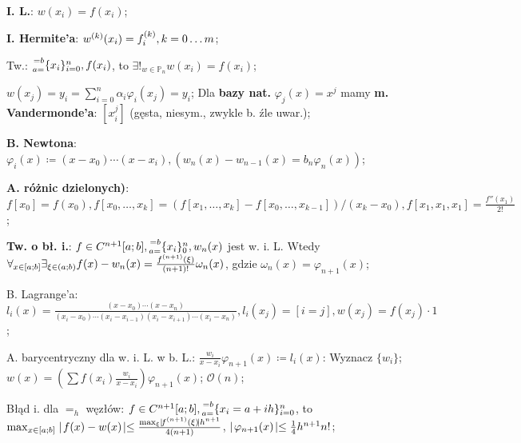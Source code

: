 
\entry
\textbf{I. L.}:
$w(x_i) = f(x_i)$;

\entry
\textbf{I. Hermite'a}:
$w^{(k)}(x_i) = f^{(k)}_i, k = 0 \ldots m$;

\entry
Tw.:
$\ipoints[i=0][n][a=][=b]{x_i}, f(x_i)$,
to
$\exists!_{w \in \mathbb{P}_n} w(x_i)=f(x_i)$;

\entry
$w(x_j) = y_i = \sum_{i=0}^n\alpha_i\varphi_i(x_j) = y_i$;
\entry
Dla \textbf{bazy nat.}
$\varphi_j(x)=x^j$
mamy \textbf{m. Vandermonde'a}:
$[x^j_i]$
(gęsta, niesym., zwykle b. źle uwar.);

\entry
\textbf{B. Newtona}:
$\varphi_i(x) \coloneqq (x-x_0)\cdots(x-x_i),
(w_n(x)-w_{n-1}(x) = b_n\varphi_n(x))$;

\entry
\textbf{A. różnic dzielonych)}:
$
f[x_0] = f(x_0),
f[x_0,\ldots,x_k] = (f[x_1,\ldots,x_k] - f[x_0,\ldots,x_{k-1}])/(x_k - x_0),
f[x_1, x_1, x_1] = \frac{f''(x_1)}{2!}
$;


\textbf{Tw. o bł. i.}:
$f\in C^{n+1}[a;b], \ipoints[0][n][a=][=b]{x_i}, w_n(x)$ jest w. i. L.
Wtedy
$\forall_{x \in [a;b]} \exists_{\xi \in (a;b)} f(x) - w_n(x) = \frac{f^{(n+1)}(\xi)}{(n+1)!}\omega_n(x)$,
gdzie $\omega_n(x)=\varphi_{n+1}(x)$;


\entry
B. Lagrange'a:
$
l_i(x) = \frac{(x-x_0)\cdots(x-x_n)}{(x_i - x_0)\cdots(x_i - x_{i-1})(x_i - x_{i+1}) \cdots (x_i - x_n)},
l_i(x_j) = [i=j],
w(x_j)=f(x_j)\cdot 1
$;

\entry
A. barycentryczny dla w. i. L. w b. L.:
$\frac{w_i}{x - x_i}\varphi_{n+1}(x) \coloneqq l_i(x)$:
Wyznacz
$\{w_i\}$;
$w(x) = (\sum f(x_i)\frac{w_i}{x - x_i})\varphi_{n+1}(x)$;
$\mathcal{O}(n)$;

\entry
Błąd i. dla $=_h$ węzłów:
$f \in C^{n+1}[a;b], \ipoints[i=0][n][a=][=b]{x_i=a+ih}$, to
$\max_{x \in [a;b]}\mid\! f(x)-w(x)\! \mid \leq \frac{\max_\xi\mid\! f^{(n+1)}(\xi)\! \mid h^{n+1}}{4(n+1)}$,
$\mid\! \varphi_{n+1}(x)\! \mid \leq \frac{1}{4} h^{n+1} n!$;

